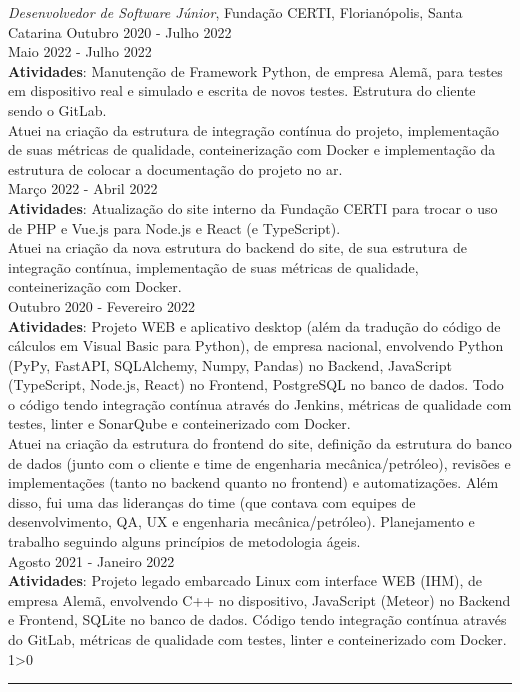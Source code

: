\documentclass[a4paper,10pt]{article}
\newcommand{\criaSecao}[4][0]{
	\begin{tcolorbox}[
        blanker,
        breakable,
        title=\begin{minipage}{0.16\linewidth}\large{\textbf{#2}}\vspace{-#3\baselineskip}\end{minipage},
        coltitle=black,
        leftupper=0.21\linewidth,
    ]
        #4
		\ifnum0#1>0 { \hrule {\ } } \fi
    \end{tcolorbox}
}
\begin{document}
    \criaSecao[1]{Experiência}{2}{
        \textit{Desenvolvedor de Software Júnior}, Fundação CERTI, Florianópolis, Santa Catarina \hfill Outubro 2020 - Julho 2022 \\
        Maio 2022 - Julho 2022\\
        \textbf{Atividades}: Manutenção de Framework Python, de empresa Alemã, para testes em dispositivo real e simulado e escrita de novos testes. Estrutura do cliente sendo o GitLab.\\

        Atuei na criação da estrutura de integração contínua do projeto, implementação de suas métricas de qualidade, conteinerização com Docker e implementação da estrutura de colocar a documentação do projeto no ar.\\

        Março 2022 -  Abril 2022\\
        \textbf{Atividades}: Atualização do site interno da Fundação CERTI para trocar o uso de PHP e Vue.js para Node.js e React (e TypeScript).\\

        Atuei na criação da nova estrutura do backend do site, de sua estrutura de integração contínua, implementação de suas métricas de qualidade, conteinerização com Docker.\\

        Outubro 2020 - Fevereiro 2022\\
        \textbf{Atividades}: Projeto WEB e aplicativo desktop (além da tradução do código de cálculos em Visual Basic para Python), de empresa nacional, envolvendo Python (PyPy, FastAPI, SQLAlchemy, Numpy, Pandas) no Backend, JavaScript (TypeScript, Node.js, React) no Frontend, PostgreSQL no banco de dados. Todo o código tendo integração contínua através do Jenkins, métricas de qualidade com testes, linter e SonarQube e conteinerizado com Docker.\\

        Atuei na criação da estrutura do frontend do site, definição da estrutura do banco de dados (junto com o cliente e time de engenharia mecânica/petróleo), revisões e implementações (tanto no backend quanto no frontend) e automatizações. Além disso, fui uma das lideranças do time (que contava com equipes de desenvolvimento, QA, UX e engenharia mecânica/petróleo). Planejamento e trabalho seguindo alguns princípios de metodologia ágeis.\\

        Agosto 2021 - Janeiro 2022\\
        \textbf{Atividades}: Projeto legado embarcado Linux com interface WEB (IHM), de empresa Alemã, envolvendo C++ no dispositivo, JavaScript (Meteor) no Backend e Frontend, SQLite no banco de dados. Código tendo integração contínua através do GitLab, métricas de qualidade com testes, linter e conteinerizado com Docker.\\

}
\end{document}

